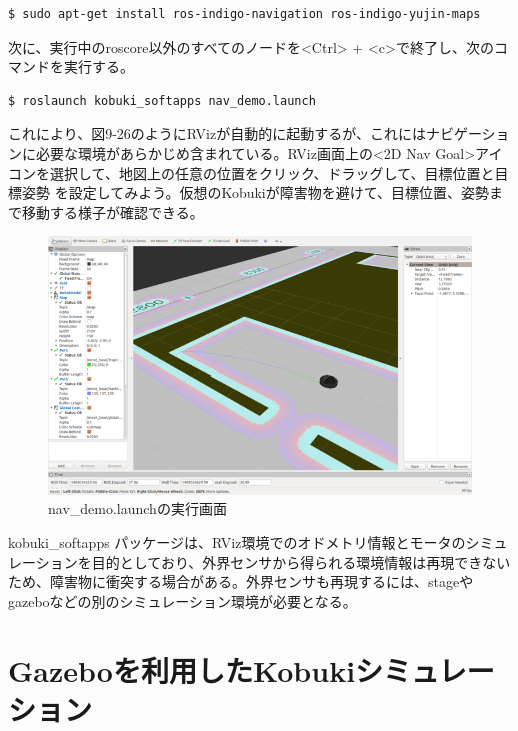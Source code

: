 \begin{itemize}
\begin{lstlisting}[language=ROS]
$ sudo apt-get install ros-indigo-navigation ros-indigo-yujin-maps
\end{lstlisting}

次に、実行中のroscore以外のすべてのノードを<Ctrl> + <c>で終了し、次のコマンドを実行する。

\begin{lstlisting}[language=ROS]
$ roslaunch kobuki_softapps nav_demo.launch
\end{lstlisting}

これにより、図9-26のようにRVizが自動的に起動するが、これにはナビゲーションに必要な環境があらかじめ含まれている。RViz画面上の<2D Nav Goal>アイコンを選択して、地図上の任意の位置をクリック、ドラッグして、目標位置と目標姿勢  を設定してみよう。仮想のKobukiが障害物を避けて、目標位置、姿勢まで移動する様子が確認できる。

\begin{figure}[ht]
  \centering
  \includegraphics[width=\columnwidth]{pictures/chapter9/pic_09_26.png}
  \caption{nav\_demo.launchの実行画面}
\end{figure}

\begin{exercise}
kobuki\_softapps パッケージは、RViz環境でのオドメトリ情報とモータのシミュレーションを目的としており、外界センサから得られる環境情報は再現できないため、障害物に衝突する場合がある。外界センサも再現するには、stageやgazeboなどの別のシミュレーション環境が必要となる。
\end{exercise}

\section{Gazeboを利用したKobukiシミュレーション}


\end{itemize}
